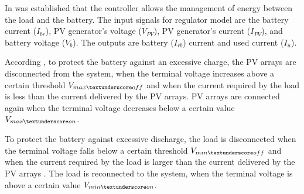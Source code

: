 \documentclass[journal]{IEEEtran}
\begin{document}
In \cite{Mellit} was established that the controller allows the management of energy between the load and the battery. The input signals for regulator model are the battery current ($ I_{br} $), PV generator's voltage ($ V_{PV} $), PV generator's current ($ I_{PV} $), and battery voltage ($ V_{b} $). The outputs are battery ($ I_{rb} $) current and used current ($ I_{u} $). 

According \cite{Hansen}, to protect the battery against an excessive charge, the PV arrays are disconnected from the system, when the terminal voltage increases above a certain threshold $ V_{max \textunderscore off} $ and when the current required by the load is less than the current delivered by the PV arrays. PV arrays are connected again when the terminal voltage decreases below a certain value $ V_{max \textunderscore on} $. 
%

To protect the battery against excessive discharge, the load is disconnected when the terminal voltage falls below a certain threshold $ V_{min \textunderscore off} $ and when the current required by the load is larger than the current delivered by the PV arrays \cite{Hansen}. The load is reconnected to the system, when the terminal voltage is above a certain value $ V_{min \textunderscore on} $.
%
%
%
\end{document}
